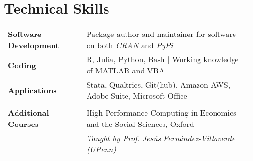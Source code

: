 \documentclass[11pt, a4paper]{article}
\begin{document}

 \section*{Technical Skills}
 \begin{tabular}{ll}
 	 \textbf{Software Development} & Package author and maintainer for software on both \textit{CRAN} and \textit{PyPi} \\
     \textbf{Coding} & R, Julia, Python, Bash $|$ Working knowledge of MATLAB and VBA \\
     \textbf{Applications} & Stata, Qualtrics, Git(hub), Amazon AWS, Adobe Suite, Microsoft Office \\
    \\
    \textbf{Additional Courses} & High-Performance Computing in Economics and the Social Sciences, Oxford \\
          & \textit{Taught by Prof. Jesús Fernández-Villaverde (UPenn)} \\
     
 \end{tabular}
\end{document}
